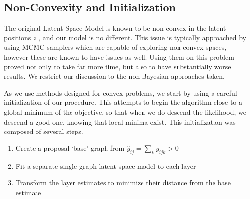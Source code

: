 \documentclass{article}
\begin{document}
\subsection{Non-Convexity and Initialization}
The original Latent Space Model is known to be non-convex in the latent positions $z$ \cite{hoff-2002}, and our model is no different. This issue is typically approached by using MCMC samplers \cite{hoff-2002, salter-townshend2017} which are capable of exploring non-convex spaces, however these are known to have issues as well. Using them on this problem proved not only to take far more time, but also to have substantially worse results. We restrict our discussion to the non-Bayesian approaches taken.

As we use methods designed for convex problems, we start by using a careful initialization of our procedure. This attempts to begin the algorithm close to a global minimum of the objective, so that when we do descend the likelihood, we descend a good one, knowing that local minima exist. This initialization was composed of several steps.
\\
\begin{enumerate}
\item Create a proposal `base' graph from $\hat{y}_{ij} =\sum_k y_{ijk} > 0$
\item Fit a separate single-graph latent space model to each layer
\item Transform the layer estimates to minimize their distance from the base estimate
\end{enumerate}
\end{document}
